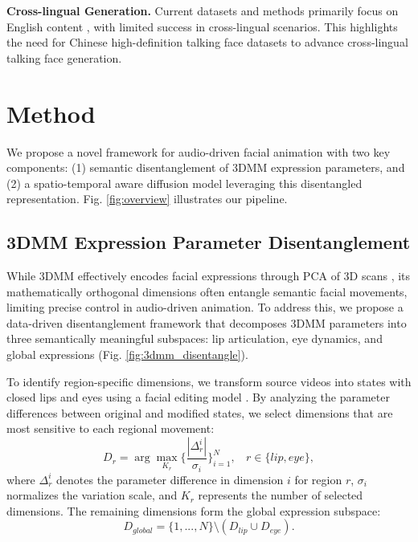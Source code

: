 \documentclass[conference]{IEEEtran}
\begin{document}
\noindent\textbf{Cross-lingual Generation.}
Current datasets and methods primarily focus on English content \cite{hdtf, vox2}, with limited success in cross-lingual scenarios. This highlights the need for Chinese high-definition talking face datasets to advance cross-lingual talking face generation.

\section{Method}
\vspace{-1mm}
We propose a novel framework for audio-driven facial animation with two key components: (1) semantic disentanglement of 3DMM expression parameters, and (2) a spatio-temporal aware diffusion model leveraging this disentangled representation. Fig. \ref{fig:overview} illustrates our pipeline.


\vspace{-1mm}
\subsection{3DMM Expression Parameter Disentanglement}
While 3DMM effectively encodes facial expressions through PCA of 3D scans \cite{3dmm,3drecon}, its mathematically orthogonal dimensions often entangle semantic facial movements, limiting precise control in audio-driven animation. To address this, we propose a data-driven disentanglement framework that decomposes 3DMM parameters into three semantically meaningful subspaces: lip articulation, eye dynamics, and global expressions (Fig. \ref{fig:3dmm_disentangle}).

To identify region-specific dimensions, we transform source videos into states with closed lips and eyes using a facial editing model \cite{liveportrait}. By analyzing the parameter differences between original and modified states, we select dimensions that are most sensitive to each regional movement:
\begin{equation}
    D_r = \arg \max_{K_r} \{\frac{|\Delta_r^i|}{\sigma_i}\}_{i=1}^N,~~~~r \in \{lip, eye\},
\end{equation}
where $\Delta_r^i$ denotes the parameter difference in dimension $i$ for region $r$, $\sigma_i$ normalizes the variation scale, and $K_r$ represents the number of selected dimensions. The remaining dimensions form the global expression subspace:
\begin{equation}
    D_{global} = \{1,...,N\} \setminus (D_{lip} \cup D_{eye}).
\end{equation}
\end{document}

